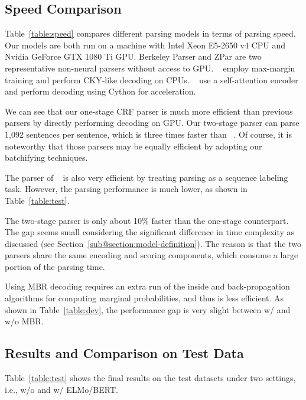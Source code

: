 \documentclass{article}
\begin{document}
\begin{table}[tb]
\begin{table}[tb]
%
 \subsection{Speed Comparison}
Table~\ref{table:speed} compares different parsing models in terms of parsing speed.
Our models are both run on a machine with Intel Xeon E5-2650 v4 CPU and Nvidia GeForce GTX 1080 Ti GPU.
Berkeley Parser and ZPar are two representative non-neural parsers without access to GPU.
\citeauthor{stern-etal-2017-minimal}~ employ max-margin training and perform CKY-like decoding on CPUs.
\citeauthor{kitaev-klein-2018-constituency}~ use a self-attention encoder and perform decoding using Cython for acceleration.


We can see that our one-stage CRF parser is much more efficient than previous parsers by directly performing decoding on GPU.
Our two-stage parser can parse 1,092 sentences per sentence, which is three times faster than \citeauthor{kitaev-klein-2018-constituency}~.
Of course, it is noteworthy that those parsers \cite{stern-etal-2017-minimal,kitaev-klein-2018-constituency} may be equally efficient by adopting our batchifying techniques.

The parser of \citeauthor{gomez-rodriguez-vilares-2018-constituent}~ is also very efficient by treating parsing as a sequence labeling task. However, the parsing performance is much lower, as shown in Table~\ref{table:test}.

The two-stage parser is only about 10\% faster than the one-stage counterpart. The gap seems small considering the significant difference in time complexity as discussed (see Section~\ref{sub@section:model-definition}).
The reason is that the two parsers share the same encoding and scoring components, which consume a large portion of the parsing time.

Using MBR decoding requires an extra run of the inside and back-propagation algorithms for computing marginal probabilities, and thus is less efficient.
As shown in Table~\ref{table:dev}, the performance gap is very slight between w/ and w/o MBR.



%
 \subsection{Results and Comparison on Test Data}
Table~\ref{table:test} shows the final results on the test datasets under two settings, i.e., w/o and w/ ELMo/BERT.


\end{table}
\end{table}
\end{document}

